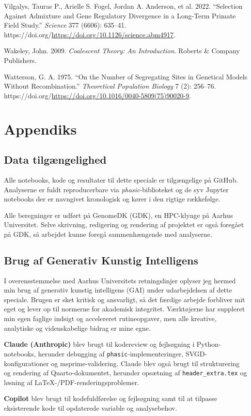 \documentclass[
  10pt,
  a4paper,
]{scrbook}
\newlength{\cslhangindent}
\newenvironment{CSLReferences}[2] %
 {\begin{list}{}{%
  \setlength{\itemindent}{0pt}
  \setlength{\leftmargin}{0pt}
  \setlength{\parsep}{0pt}
  \ifodd #1
   \setlength{\leftmargin}{\cslhangindent}
   \setlength{\itemindent}{-1\cslhangindent}
  \fi
  \setlength{\itemsep}{#2\baselineskip}}}
 {\end{list}}
\let\oldemph\emph
\renewcommand\emph[1]{\oldemph{\color{gray}#1}}
\begin{document}
\begin{CSLReferences}{1}{1}
{Vilgalys, Tauras P., Arielle S. Fogel, Jordan A. Anderson, et al.}
2022. {``Selection Against Admixture and Gene Regulatory Divergence in a
Long-Term Primate Field Study.''} \emph{Science} 377 (6606): 635--41.
https://doi.org/\url{https://doi.org/10.1126/science.abm4917}.

Wakeley, John. 2009. \emph{Coalescent Theory: An Introduction}. Roberts
\& Company Publishers.

Watterson, G. A. 1975. {``On the Number of Segregating Sites in
Genetical Models Without Recombination.''} \emph{Theoretical Population
Biology} 7 (2): 256--76.
https://doi.org/\url{https://doi.org/10.1016/0040-5809(75)90020-9}.

\end{CSLReferences}

\chapter{Appendiks}\label{appendiks}

\section{Data tilgængelighed}\label{data-tilguxe6ngelighed}

Alle notebooks, kode og resultater til dette speciale er tilgængelige på
GitHub. Analyserne er fuldt reproducerbare via \emph{phasic}-biblioteket
og de syv Jupyter notebooks der er navngivet kronologisk og kører i den
rigtige rækkefølge.

Alle beregninger er udført på GenomeDK (GDK), en HPC-klynge på Aarhus
Universitet. Selve skrivning, redigering og rendering af projektet er
også foregået på GDK, så arbejdet kunne foregå sammenhængende med
analyserne.

\section{Brug af Generativ Kunstig
Intelligens}\label{brug-af-generativ-kunstig-intelligens}

I overensstemmelse med Aarhus Universitets retningslinjer oplyser jeg
hermed min brug af generativ kunstig intelligens (GAI) under
udarbejdelsen af dette speciale. Brugen er sket kritisk og ansvarligt,
så det færdige arbejde forbliver mit eget og lever op til normerne for
akademisk integritet. Værktøjerne har suppleret min egen faglige indsigt
og accelereret rutineopgaver, men alle kreative, analytiske og
videnskabelige bidrag er mine egne.

\textbf{Claude (Anthropic)} blev brugt til kodereview og fejlsøgning i
Python-notebooks, herunder debugging af
\texttt{phasic}-implementeringer, SVGD-konfigurationer og
msprime-validering. Claude blev også brugt til strukturering og
rendering af Quarto-dokumentet, herunder opsætning af
\texttt{header\_extra.tex} og løsning af LaTeX-/PDF-renderingsproblemer.

\textbf{Copilot} blev brugt til kodefuldførelse og fejlsøgning samt til
at tilpasse eksisterende kode til opdaterede variable og analysebehov.


\backmatter
\end{document}
